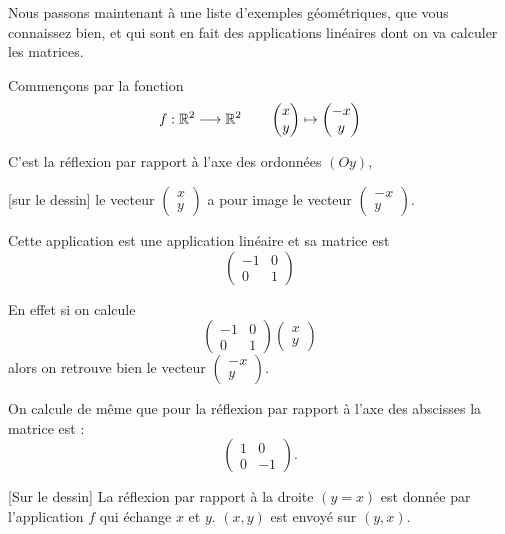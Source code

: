 Nous passons maintenant à une liste d'exemples géométriques, que vous connaissez bien,
et qui sont en fait des applications linéaires dont on va calculer les matrices.

Commençons par la fonction
$$f : \mathbb{R}^2 \longrightarrow \mathbb{R}^2 \qquad \begin{pmatrix} x \\ y \end{pmatrix} \mapsto \begin{pmatrix} -x \\ y \end{pmatrix}$$

C'est la réflexion par rapport à l'axe des ordonnées $(Oy)$, 

[sur le dessin] le vecteur $\begin{pmatrix} x \\ y \end{pmatrix}$ a pour image le vecteur 
$\begin{pmatrix} -x \\ y \end{pmatrix}$.

Cette application est une application linéaire et sa matrice est 
$$\begin{pmatrix}-1 & 0 \\ 0 & 1 \end{pmatrix}$$

En effet si on calcule 
$$
\begin{pmatrix} -1 & 0 \\ 0 & 1 \end{pmatrix}
\begin{pmatrix} x \\ y \end{pmatrix}$$
alors on retrouve bien le vecteur $\begin{pmatrix} -x \\ y \end{pmatrix}$.


\diapo

On calcule de même que pour la réflexion par rapport à l'axe 
des abscisses la matrice est :
\[\begin{pmatrix} 1 & 0\\ 0 & -1 \end{pmatrix}.\]


\diapo

[Sur le dessin] La réflexion par rapport à la droite $(y=x)$ est donnée par
l'application $f$ qui échange $x$ et $y$.
 $(x,y)$ est envoyé sur $(y,x)$.

